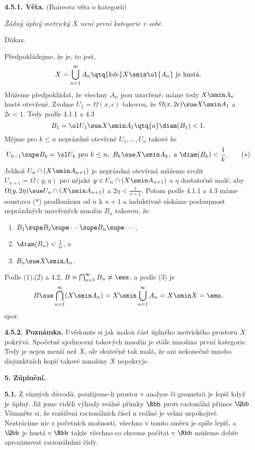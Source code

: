 \documentclass[12pt]{article}
\begin{document}
\medskip

{\bf 4.5.1. Věta.} (Baireova věta o kategorii) {\em Žádný úplný metrický $X$ není první kategorie v sobě.

Důkaz.} Předpokládejme, že je, to jest,
$$
X=\bigcup_{n=1}^\infty A_n\qtq{kde} X\smin \ol{A_n}\ \text{je hustá}.
$$
Můžeme předpokládat, že všechny $A_n$ jsou uzavřené;  máme tedy  $X\smin A_n$ husté otevřené.
Zvolme $U_1=\Omega(x,\epsilon)$ takovou, že $\Omega(x,2\epsilon)\sue X\smin A_1$ a $2\epsilon<1$. Tedy podle 4.1.1 a 4.3
$$
B_1=\ol U_1\sue X\smin A_1\qtq{a} \diam(B_1)<1.
$$
Mějme pro $k\leq n$ neprázdné otevřené $U_1,\dots,U_n$ takové že
\begin{equation}
  U_{k-1}\supe B_k=\ol U_k \ \text{pro}\  k\leq n,\ B_k\sue X\smin A_k,  \ \text{a}\ \diam(B_k)<\frac1k.
\tag{$*$}
\end{equation}
Jelikož $U_n\cap(X\smin A_{n+1})$ je neprázdná otevřená můžeme zvolit
 $U_{n+1}=\Omega(y,\eta)$ pro nějaké $y\in U_n\cap(X\smin A_{n+1})$ a
 $\eta$  dostatečně malé, aby $\Omega(y,2\eta)\sue U_n\cap(X\smin A_{n+1})$ a $2\eta<\frac1{n+1}$. Potom podle 4.1.1 a 4.3 máme
soustavu ($*$) prodlouženu od $n$ k $n+1$  a induktivně získáme
posloupnost neprázdných uzavřených množin $B_n$ takovou, že
\begin{enumerate}
\item $B_1\supe B_2\supe\cdots\supe B_n\supe\cdots$,
\item $\diam(B_n)<\frac1{n}$, a
\item $B_n\sue X\smin A_n$.
\end{enumerate} 
Podle (1),(2) a 4.2, $B=\bigcap_{n=1}^\infty B_n\neq\ems$, a podle (3) je
$$
B\sue \bigcap_{n=1}^\infty(X\smin A_n)=X\smin\bigcup_{n=1}^\infty A_n=X\smin X=\ems,
$$
spor. \sq

\medskip

{\bf 4.5.2. Poznámka.} Uvědomte si jak malou část úplného metrického prostoru  $X$ pokrývá. Spočetné sjednocení takových množin je stále množina první kategorie. Tedy je nejen menší než
  $X$, ale skutečně tak malá, že ani nekonečně mnoho disjunktních kopií takové množiny 
 $X$ nepokryje.

\vskip10mm
 
 {\large\bf 5. Zúplnění.}
 
 \bigskip
 
 {\bf 5.1.} Z různých důvodů, použijeme-li prostor v analyse či geometrii je lepší když je úplný.
 Již jsme viděli výhody reálné přímky $\Rbb$ proti racionální přímce $\Qbb$. Všimněte si, že rozšíření racionálních čísel n reálné je velmi uspokojivé. Neztrácíme nic z početních možností, všechno v tomto směru je spíše lepší, a $\Qbb$ je hustá v $\Rbb$
 takže všechno co chceme počítat v $\Rbb$ můžeme dobře aproximovat racionálními čísly.
 
\end{document}
